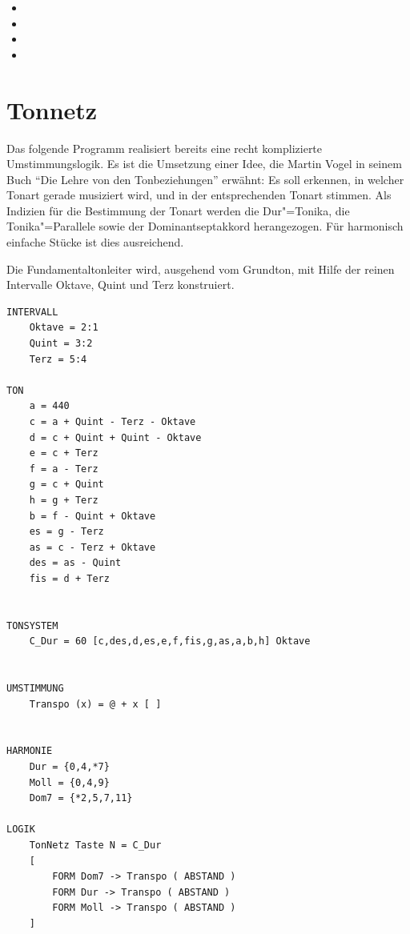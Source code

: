 \begin{itemize}
\item {} 
\item {}
\item {}
\item {}
\end{itemize}



\section{Tonnetz}
\label{sec:EX_TONENET}
Das folgende Programm realisiert bereits eine recht komplizierte 
Umstimmungslogik. Es ist die Umsetzung einer Idee, die Martin 
Vogel in seinem Buch "`Die Lehre von den Tonbeziehungen"' erwähnt: 
Es soll erkennen, in welcher Tonart gerade musiziert wird, und 
in der entsprechenden Tonart  stimmen. Als 
Indizien für die Bestimmung der Tonart werden die Dur"=Tonika, 
die Tonika"=Parallele sowie der Dominantseptakkord herangezogen. 
Für harmonisch einfache Stücke ist dies ausreichend.

Die Fundamentaltonleiter wird, ausgehend vom Grundton, mit Hilfe 
der reinen Intervalle Oktave, Quint und Terz konstruiert.


\begin{verbatim}
INTERVALL  
    Oktave = 2:1
    Quint = 3:2 
    Terz = 5:4

TON
    a = 440 
    c = a + Quint - Terz - Oktave 
    d = c + Quint + Quint - Oktave 
    e = c + Terz  
    f = a - Terz 
    g = c + Quint 
    h = g + Terz  
    b = f - Quint + Oktave 
    es = g - Terz 
    as = c - Terz + Oktave 
    des = as - Quint 
    fis = d + Terz 


TONSYSTEM  
    C_Dur = 60 [c,des,d,es,e,f,fis,g,as,a,b,h] Oktave


UMSTIMMUNG 
    Transpo (x) = @ + x [ ]


HARMONIE 
    Dur = {0,4,*7}
    Moll = {0,4,9} 
    Dom7 = {*2,5,7,11}

LOGIK 
    TonNetz Taste N = C_Dur
    [ 
        FORM Dom7 -> Transpo ( ABSTAND ) 
        FORM Dur -> Transpo ( ABSTAND )  
        FORM Moll -> Transpo ( ABSTAND )  
    ]
\end{verbatim}


